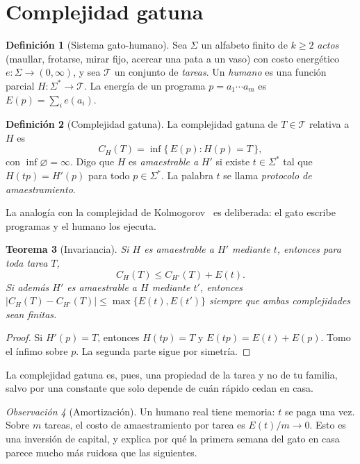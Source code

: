 \documentclass[11pt,a4paper]{article}
\theoremstyle{plain}
\newtheorem{teorema}{Teorema}[section]
\theoremstyle{definition}
\newtheorem{definicion}[teorema]{Definición}
\theoremstyle{remark}
\newtheorem{observacion}[teorema]{Observación}
\numberwithin{equation}{section}
\newcommand{\cg}{C}
\begin{document}
\section{Complejidad gatuna}\label{sec:complejidad}

\begin{definicion}[Sistema gato-humano]\label{def:sistema}
Sea $\Sigma$ un alfabeto finito de $k\ge 2$ \emph{actos} (maullar, frotarse, mirar fijo, acercar una pata a un vaso) con costo energético $e:\Sigma\to(0,\infty)$, y sea $\mathcal T$ un conjunto de \emph{tareas}. Un \emph{humano} es una función parcial $H:\Sigma^*\to\mathcal T$. La energía de un programa $p=a_1\cdots a_m$ es $E(p)=\sum_i e(a_i)$.
\end{definicion}

\begin{definicion}[Complejidad gatuna]
La complejidad gatuna de $T\in\mathcal T$ relativa a $H$ es
\begin{equation}
  \cg_H(T)=\inf\{\,E(p) : H(p)=T\,\},
\end{equation}
con $\inf\varnothing=\infty$. Digo que $H$ es \emph{amaestrable a} $H'$ si existe $t\in\Sigma^*$ tal que $H(tp)=H'(p)$ para todo $p\in\Sigma^*$. La palabra $t$ se llama \emph{protocolo de amaestramiento}.
\end{definicion}

La analogía con la complejidad de Kolmogorov~\cite{kolmogorov,livitanyi} es deliberada: el gato escribe programas y el humano los ejecuta.

\begin{teorema}[Invariancia]\label{teo:invariancia}
Si $H$ es amaestrable a $H'$ mediante $t$, entonces para toda tarea $T$,
\begin{equation}
  \cg_H(T)\le \cg_{H'}(T)+E(t).
\end{equation}
Si además $H'$ es amaestrable a $H$ mediante $t'$, entonces $|\cg_H(T)-\cg_{H'}(T)|\le\max\{E(t),E(t')\}$ siempre que ambas complejidades sean finitas.
\end{teorema}

\begin{proof}
Si $H'(p)=T$, entonces $H(tp)=T$ y $E(tp)=E(t)+E(p)$. Tomo el ínfimo sobre $p$. La segunda parte sigue por simetría.
\end{proof}

La complejidad gatuna es, pues, una propiedad de la tarea y no de tu familia, salvo por una constante que solo depende de cuán rápido cedan en casa.

\begin{observacion}[Amortización]
Un humano real tiene memoria: $t$ se paga una vez. Sobre $m$ tareas, el costo de amaestramiento por tarea es $E(t)/m\to 0$. Esto es una inversión de capital, y explica por qué la primera semana del gato en casa parece mucho más ruidosa que las siguientes.
\end{observacion}
\end{document}
